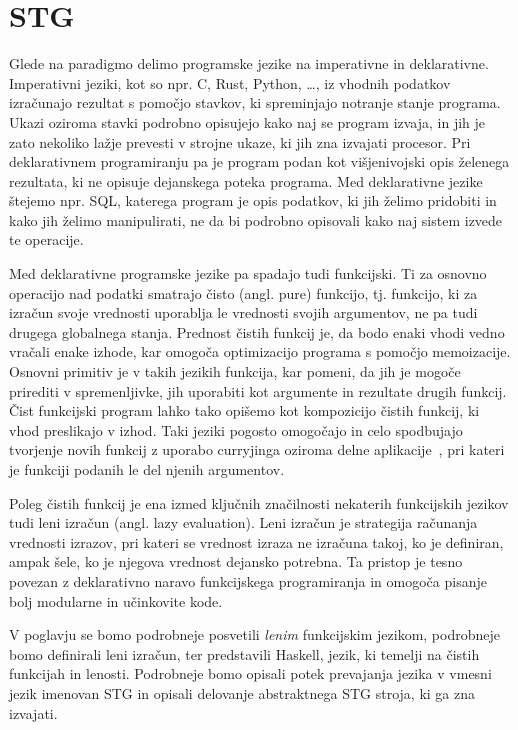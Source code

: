 \chapter{STG}
\label{ch:stg}

Glede na paradigmo delimo programske jezike na imperativne in deklarativne. Imperativni jeziki, kot so npr. C, Rust, Python, \dots, iz vhodnih podatkov izračunajo rezultat s pomočjo stavkov, ki spreminjajo notranje stanje programa. Ukazi oziroma stavki podrobno opisujejo kako naj se program izvaja, in jih je zato nekoliko lažje prevesti v strojne ukaze, ki jih zna izvajati procesor. Pri deklarativnem programiranju pa je program podan kot višjenivojski opis želenega rezultata, ki ne opisuje dejanskega poteka programa. Med deklarativne jezike štejemo npr. SQL, katerega program je opis podatkov, ki jih želimo pridobiti in kako jih želimo manipulirati, ne da bi podrobno opisovali kako naj sistem izvede te operacije.

Med deklarativne programske jezike pa spadajo tudi funkcijski. Ti za osnovno operacijo nad podatki smatrajo čisto (angl. pure) funkcijo, tj. funkcijo, ki za izračun svoje vrednosti uporablja le vrednosti svojih argumentov, ne pa tudi drugega globalnega stanja. Prednost čistih funkcij je, da bodo enaki vhodi vedno vračali enake izhode, kar omogoča optimizacijo programa s pomočjo memoizacije. Osnovni primitiv je v takih jezikih funkcija, kar pomeni, da jih je mogoče prirediti v spremenljivke, jih uporabiti kot argumente in rezultate drugih funkcij. Čist funkcijski program lahko tako opišemo kot kompozicijo čistih funkcij, ki vhod preslikajo v izhod. Taki jeziki pogosto omogočajo in celo spodbujajo tvorjenje novih funkcij z uporabo curryjinga oziroma delne aplikacije~\cite{10.1145/72551.72554}, pri kateri je funkciji podanih le del njenih argumentov.

Poleg čistih funkcij je ena izmed ključnih značilnosti nekaterih funkcijskih jezikov tudi leni izračun (angl. lazy evaluation). Leni izračun je strategija računanja vrednosti izrazov, pri kateri se vrednost izraza ne izračuna takoj, ko je definiran, ampak šele, ko je njegova vrednost dejansko potrebna. Ta pristop je tesno povezan z deklarativno naravo funkcijskega programiranja in omogoča pisanje bolj modularne in učinkovite kode.

V poglavju se bomo podrobneje posvetili \textit{lenim} funkcijskim jezikom, podrobneje bomo definirali leni izračun, ter predstavili Haskell, jezik, ki temelji na čistih funkcijah in lenosti. Podrobneje bomo opisali potek prevajanja jezika v vmesni jezik imenovan STG in opisali delovanje abstraktnega STG stroja, ki ga zna izvajati.

